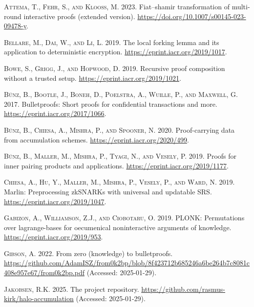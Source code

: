 \documentclass[
]{article}
\newlength{\cslhangindent}
\newenvironment{CSLReferences}[2] %
 {\begin{list}{}{%
  \setlength{\itemindent}{0pt}
  \setlength{\leftmargin}{0pt}
  \setlength{\parsep}{0pt}
  \ifodd #1
   \setlength{\leftmargin}{\cslhangindent}
   \setlength{\itemindent}{-1\cslhangindent}
  \fi
  \setlength{\itemsep}{#2\baselineskip}}}
 {\end{list}}
\begin{document}
\label{refs}
\begin{CSLReferences}{1}{1}
\textsc{Attema, T., Fehr, S., and Klooß, M.} 2023. Fiat--shamir
transformation of multi-round interactive proofs (extended version).
\url{https://doi.org/10.1007/s00145-023-09478-y}.

\textsc{Bellare, M., Dai, W., and Li, L.} 2019. The local forking lemma
and its application to deterministic encryption.
\url{https://eprint.iacr.org/2019/1017}.

\textsc{Bowe, S., Grigg, J., and Hopwood, D.} 2019. Recursive proof
composition without a trusted setup.
\url{https://eprint.iacr.org/2019/1021}.

\textsc{Bünz, B., Bootle, J., Boneh, D., Poelstra, A., Wuille, P., and
Maxwell, G.} 2017. Bulletproofs: Short proofs for confidential
transactions and more. \url{https://eprint.iacr.org/2017/1066}.

\textsc{Bünz, B., Chiesa, A., Mishra, P., and Spooner, N.} 2020.
Proof-carrying data from accumulation schemes.
\url{https://eprint.iacr.org/2020/499}.

\textsc{Bünz, B., Maller, M., Mishra, P., Tyagi, N., and Vesely, P.}
2019. Proofs for inner pairing products and applications.
\url{https://eprint.iacr.org/2019/1177}.

\textsc{Chiesa, A., Hu, Y., Maller, M., Mishra, P., Vesely, P., and
Ward, N.} 2019. Marlin: Preprocessing {zkSNARKs} with universal and
updatable {SRS}. \url{https://eprint.iacr.org/2019/1047}.

\textsc{Gabizon, A., Williamson, Z.J., and Ciobotaru, O.} 2019. {PLONK}:
Permutations over lagrange-bases for oecumenical noninteractive
arguments of knowledge. \url{https://eprint.iacr.org/2019/953}.

\textsc{Gibson, A.} 2022. From zero (knowledge) to bulletproofs.
\url{https://github.com/AdamISZ/from0k2bp/blob/8f423712b685246a6be264b7c8081c408e957e67/from0k2bp.pdf}
(Accessed: 2025-01-29).

\textsc{Jakobsen, R.K.} 2025. The project repository.
\url{https://github.com/rasmus-kirk/halo-accumulation} (Accessed:
2025-01-29).


\end{CSLReferences}
\end{document}
